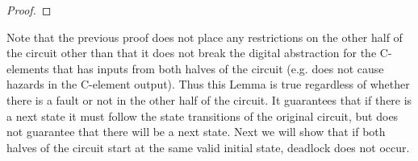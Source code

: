 \documentclass[12pt]{report}
\begin{document}
\begin{proof}

\end{proof}

Note that the previous proof does not place any restrictions on the other half of the circuit other than that it does not break the digital abstraction for the C-elements that has inputs from both halves of the circuit (e.g. does not cause hazards in the C-element output).  Thus this Lemma is true regardless of whether there is a fault or not in the other half of the circuit.  It guarantees that if there is a next state it must follow the state transitions of the original circuit, but does not guarantee that there will be a next state.  %
Next we will show that if both halves of the circuit start at the same valid initial state, deadlock does not occur.
\end{document}
